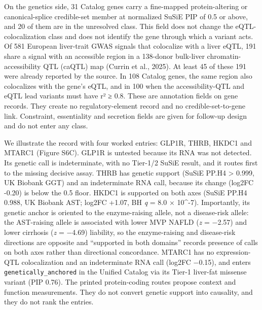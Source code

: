 On the genetics side, 31 Catalog genes carry a fine-mapped protein-altering or
canonical-splice credible-set member at normalized SuSiE PIP of 0.5 or above,
and 20 of them are in the unresolved class. This field does not change the
eQTL-colocalization class and does not identify the gene through which a variant
acts. Of 581 European liver-trait GWAS signals that colocalize with a liver
eQTL, 191 share a signal with an accessible region in a 138-donor bulk-liver
chromatin-accessibility QTL (caQTL) map (Currin et al., 2025). At least 45 of
these 191 were already reported by the source. In 108 Catalog genes, the same region also
colocalizes with the gene's eQTL, and in 100 when the accessibility-QTL and
eQTL lead variants must have r² ≥ 0.8. These are annotation fields on
gene records. They create no regulatory-element record and no
credible-set-to-gene link. Constraint, essentiality and secretion fields are
given for follow-up design and do not enter any class.

We illustrate the record with four worked entries: GLP1R, THRB, HKDC1 and MTARC1
(Figure S6C). GLP1R is untested because its RNA was not detected. Its genetic call is
indeterminate, with no Tier-1/2 SuSiE result, and it routes first to the missing
decisive assay. THRB has genetic
support (SuSiE PP.H4 \textgreater{} 0.999, UK Biobank GGT) and an indeterminate RNA call,
because its change (log2FC -0.20) is below the 0.5 floor. HKDC1 is supported on
both axes (SuSiE PP.H4 0.988, UK Biobank AST; log2FC +1.07, BH \emph{q} = 8.0 ×
10\^{}-7). Importantly, its genetic anchor is oriented to the enzyme-raising allele,
not a disease-risk allele: the AST-raising allele is associated with lower MVP NAFLD
(\emph{z} = $-$2.57) and lower cirrhosis (\emph{z} = $-$4.69) liability, so the
enzyme-raising and disease-risk directions are opposite and ``supported in both domains''
records presence of calls on both axes rather than directional concordance. MTARC1 has no
expression-QTL colocalization and an indeterminate RNA call (log2FC $-$0.15), and enters
\texttt{genetically\_anchored} in the Unified Catalog via its Tier-1 liver-fat missense
variant (PIP 0.76). The printed protein-coding routes propose context and function measurements.
They do not convert genetic support into causality, and they do not rank the entries.

